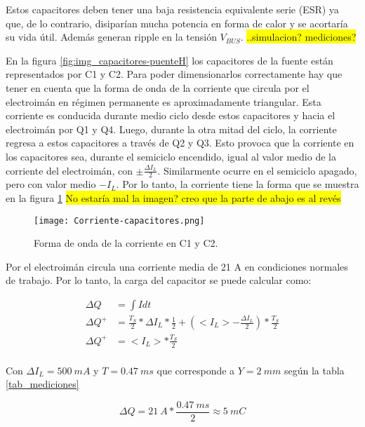 \noindent Estos capacitores deben tener una baja resistencia equivalente serie (ESR) ya que, de lo contrario, disiparían mucha potencia en forma de calor y se acortaría su vida útil. Además generan ripple en la tensión $V_{BUS}$. \colorbox{yellow}{..simulacion? mediciones?}

\noindent En la figura \ref{fig:img_capacitores-puenteH} los capacitores de la fuente están representados por C1 y C2. Para poder dimensionarlos correctamente hay que tener en cuenta que la forma de onda de la corriente que circula por el electroimán en régimen permanente es aproximadamente triangular. Esta corriente es conducida durante medio ciclo desde estos capacitores y hacia el electroimán por Q1 y Q4. Luego, durante la otra mitad del ciclo, la corriente regresa a estos capacitores a través de Q2 y Q3. Esto provoca que la corriente en los capacitores sea, durante el semiciclo encendido, igual al valor medio de la corriente del electroimán, con $ \pm \frac{\Delta I_L}{2}$. Similarmente ocurre en el semiciclo apagado, pero con valor medio $-I_L$.  Por lo tanto,  la corriente tiene la forma que se muestra en la figura \ref{fig:img_ccorriente-capacitores}
\colorbox{yellow}{No estaría mal la imagen? creo que la parte de abajo es al revés}
\begin{figure}[H]
	\centering
	\texttt{[image: Corriente-capacitores.png]}
	\caption{Forma de onda de la corriente en C1 y C2.}
	\label{fig:img_ccorriente-capacitores}
\end{figure}

\noindent Por el electroimán circula una corriente media de 21 A en condiciones normales de trabajo. Por lo tanto, la carga del capacitor se puede calcular como:

\begin{equation} 
	\begin{aligned}
   	\Delta Q &= \int I dt\\	
	\Delta Q ^+ &= \frac{T_S}{2}*\Delta I_L * \frac{1}{2} + (<I_L> -\frac{\Delta I_L}{2})*\frac{T_S}{2}\\
	\Delta Q ^+ &= <I_L> *\frac{T_S}{2}\\
	\end{aligned}
\end{equation}

\noindent Con $\Delta I_L=500 \:mA$ y $T=0.47\:ms$ que corresponde a $Y = 2 \:mm$ según la tabla \ref{tab_mediciones}

\begin{equation} 
\Delta Q = 21\:A * \frac{0.47\:ms}{2} \approx 5\:mC
\end{equation}

